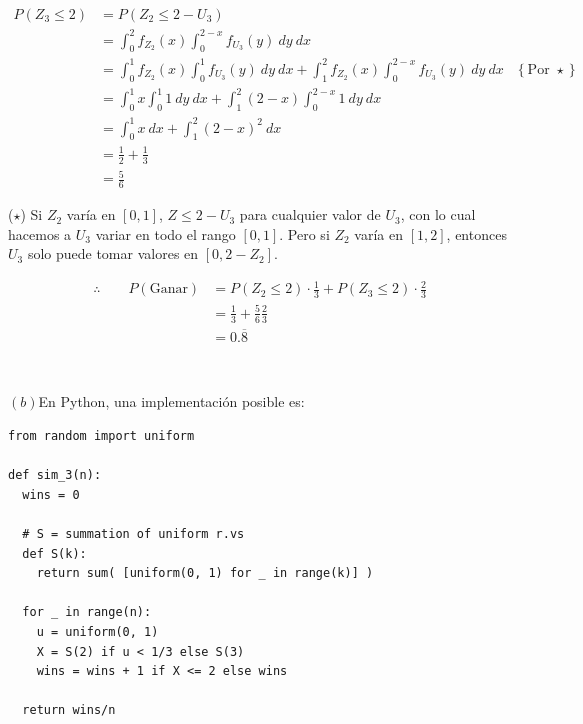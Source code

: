 \documentclass[a4paper, 12pt]{article}
\begin{document}
\begin{align*}
  P(Z_3 \leq 2) 
  &=P(Z_2 \leq 2 - U_3)\\
  &= \int_0^2 f_{Z_2}(x) \int_0^{2-x} f_{U_3}(y) ~ dy ~ dx \\ 
  &= \int_0^1 f_{Z_2}(x) \int_0^{1} f_{U_3}(y) ~ dy ~ dx + \int_1^2 f_{Z_2}(x)
  \int_0^{2-x} f_{U_3}(y) ~ dy ~ dx &\left\{ \text{Por } \star \right\}  \\
                                    &=\int_0^1 x \int_0^1 1 ~ dy ~ dx +
                                    \int_{1}^2 (2-x) \int_0^{2 - x} 1 ~ dy ~ dx\\
  &=\int_0^1 x ~ dx + \int_1^2 (2-x)^2 ~ dx \\
  &=\frac{1}{2} + \frac{1}{3} \\ 
  &= \frac{5}{6}
\end{align*}

\begin{myframe}
  ($\star$) Si $Z_2$ varía en $[0, 1]$, $Z \leq 2 - U_3$ para cualquier valor de
  $U_3$, con lo cual hacemos a $U_3$ variar en todo el rango $[0, 1]$.  Pero si
  $Z_2$ varía en $[1, 2]$, entonces $U_3$ solo puede tomar valores en $[0, 2 -
  Z_2]$.
\end{myframe}

\begin{align*}
  \therefore \qquad P(\text{Ganar}) 
  &= P(Z_2 \leq 2) \cdot \frac{1}{3} + P(Z_3 \leq 2) \cdot
  \frac{2}{3} \\ 
  &= \frac{1}{3} + \frac{5}{6}\frac{2}{3} \\ 
  &= 0.\overline{8}
\end{align*}

~

$(b)$En Python, una implementación posible es:

\begin{verbatim}
from random import uniform

def sim_3(n):
  wins = 0 

  # S = summation of uniform r.vs
  def S(k): 
    return sum( [uniform(0, 1) for _ in range(k)] )

  for _ in range(n):
    u = uniform(0, 1)
    X = S(2) if u < 1/3 else S(3)
    wins = wins + 1 if X <= 2 else wins

  return wins/n
\end{verbatim}


\pagebreak 
\end{document}
